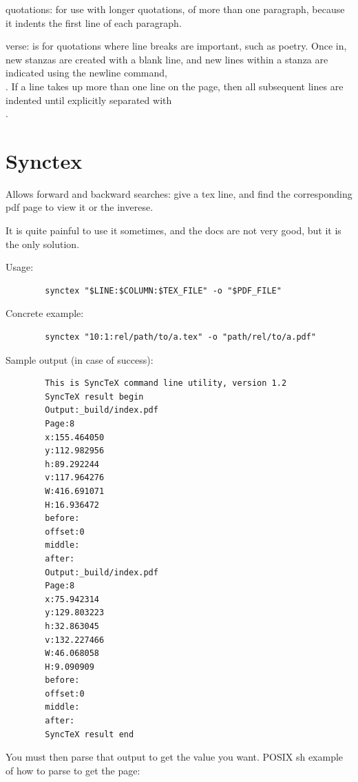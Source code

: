 \documentclass[12pt]{article}
\begin{document}
    quotations:
        for use with longer quotations, of more than one paragraph, because it indents the first line of each paragraph.

    verse:
        is for quotations where line breaks are important, such as poetry. Once in, new stanzas are created with a blank line, and new lines within a stanza are indicated using the newline command, \\. If a line takes up more than one line on the page, then all subsequent lines are indented until explicitly separated with \\.

\section{Synctex}\label{synctex}

    Allows forward and backward searches: give a tex line, and find the corresponding pdf page to view it or the inverese.

    It is quite painful to use it sometimes, and the docs are not very good, but it is the only solution.

    Usage:

    \begin{lstlisting}
        synctex "$LINE:$COLUMN:$TEX_FILE" -o "$PDF_FILE"
    \end{lstlisting}

    Concrete example:

    \begin{lstlisting}
        synctex "10:1:rel/path/to/a.tex" -o "path/rel/to/a.pdf"
    \end{lstlisting}

    Sample output (in case of success):

    \begin{lstlisting}
        This is SyncTeX command line utility, version 1.2
        SyncTeX result begin
        Output:_build/index.pdf
        Page:8
        x:155.464050
        y:112.982956
        h:89.292244
        v:117.964276
        W:416.691071
        H:16.936472
        before:
        offset:0
        middle:
        after:
        Output:_build/index.pdf
        Page:8
        x:75.942314
        y:129.803223
        h:32.863045
        v:132.227466
        W:46.068058
        H:9.090909
        before:
        offset:0
        middle:
        after:
        SyncTeX result end
    \end{lstlisting}

    You must then parse that output to get the value you want.
    POSIX sh example of how to parse to get the page:
\end{document}
